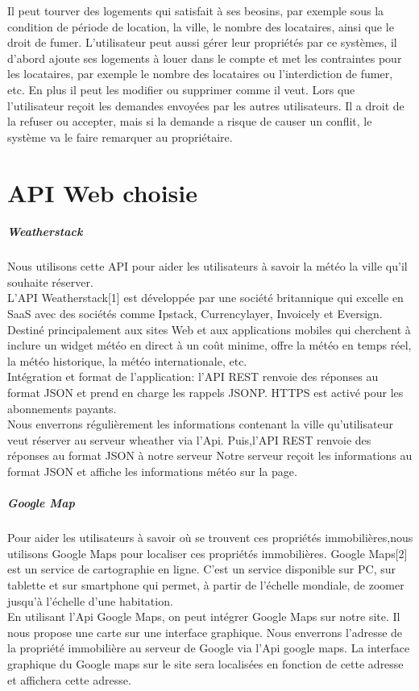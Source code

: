 \documentclass[14px]{article}
\begin{document}
Il peut tourver des logements qui satisfait à ses beosins, par exemple sous la condition de période de location, la ville, le nombre des locataires, ainsi que le droit de fumer.
L'utilisateur peut aussi gérer leur propriétés par ce systèmes, il d'abord ajoute ses logements à louer dans le compte et met les contraintes pour les locataires, par exemple le nombre des locataires ou l'interdiction de fumer, etc.  En plus il peut les modifier ou supprimer comme il veut. Lors que l'utilisateur reçoit les demandes envoyées par les autres utilisateurs. Il a droit de la refuser ou accepter, mais si la demande a risque de causer un conflit, le système va le faire remarquer au propriétaire.

\section{API Web choisie}
\subparagraph{Weatherstack}
Nous utilisons cette API pour aider les utilisateurs à savoir la météo la ville qu'il souhaite réserver.\\
L'API Weatherstack[1] est développée par une société britannique qui excelle en SaaS avec des sociétés comme Ipstack, Currencylayer, Invoicely et Eversign. Destiné principalement aux sites Web et aux applications mobiles qui cherchent à inclure un widget météo en direct à un coût minime, offre la météo en temps réel, la météo historique, la météo internationale, etc.\\
Intégration et format de l'application: l'API REST renvoie des réponses au format JSON et prend en charge les rappels JSONP. HTTPS est activé pour les abonnements payants.\\
Nous enverrons régulièrement les informations contenant la ville qu'utilisateur veut réserver au serveur wheather via l'Api. Puis,l'API REST renvoie des réponses au format JSON à notre serveur Notre serveur reçoit les informations au format JSON et affiche les informations météo sur la page.
\subparagraph{Google Map}
Pour aider les utilisateurs à savoir où se trouvent ces propriétés immobilières,nous utilisons Google Maps pour localiser ces propriétés immobilières.
Google Maps[2] est un service de cartographie en ligne. C'est un service disponible sur PC, sur tablette et sur smartphone qui permet, à partir de l'échelle mondiale, de zoomer jusqu'à l'échelle d'une habitation.\\
En utilisant l'Api Google Maps, on peut intégrer Google Maps sur notre site. Il nous propose une carte sur une interface graphique. Nous enverrons l'adresse de la propriété immobilière au serveur de Google via l'Api google maps. La interface graphique du Google maps sur le site sera localisées en fonction de cette adresse et affichera cette adresse.
\end{document}
